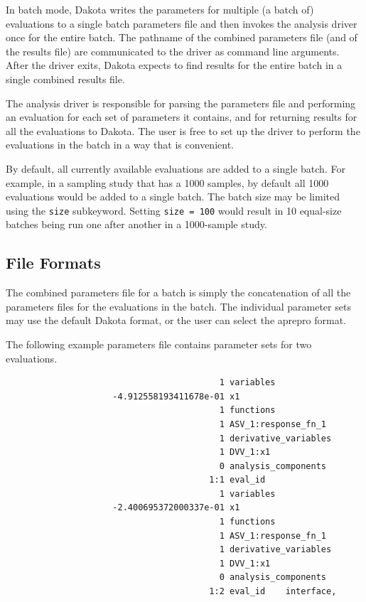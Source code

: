 In batch mode, Dakota writes the parameters for multiple (a batch of)
evaluations to a single batch parameters file and then invokes the
analysis driver once for the entire batch. The pathname of the
combined parameters file (and of the results file) are communicated
to the driver as command line arguments. After the driver exits, Dakota
expects to find results for the entire batch in a single combined results
file.

The analysis driver is responsible for parsing the parameters file
and performing an evaluation for each set of parameters it contains,
and for returning results for all the evaluations to Dakota. The user
is free to set up the driver to perform the evaluations in the batch in
a way that is convenient.

By default, all currently available evaluations are added to a single
batch. For example, in a sampling study that has a 1000 samples, by
default all 1000 evaluations would be added to a single batch. The batch
size may be limited using the \texttt{size} subkeyword. Setting 
\texttt{size = 100} would result in 10 equal-size batches being run one
after another in a 1000-sample study. 

\subsection{File Formats}

The combined parameters file for a batch is simply the concatenation of 
all the parameters files for the evaluations in the batch. The individual
parameter sets may use the default Dakota format, or the user can select
the aprepro format.

The following example parameters file contains parameter sets for two
evaluations. 

\begin{small}
\begin{verbatim}
                                          1 variables
                     -4.912558193411678e-01 x1
                                          1 functions
                                          1 ASV_1:response_fn_1
                                          1 derivative_variables
                                          1 DVV_1:x1
                                          0 analysis_components
                                        1:1 eval_id
                                          1 variables
                     -2.400695372000337e-01 x1
                                          1 functions
                                          1 ASV_1:response_fn_1
                                          1 derivative_variables
                                          1 DVV_1:x1
                                          0 analysis_components
                                        1:2 eval_id    interface,
\end{verbatim}
\end{small}

